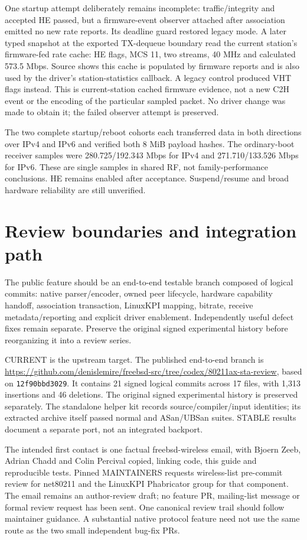 \documentclass[11pt,letterpaper,oneside]{article}
\newcommand{\code}[1]{\texttt{\small #1}}
\begin{document}
One startup attempt deliberately remains incomplete: traffic/integrity and accepted HE passed, but a firmware-event observer attached after association emitted no new rate reports. Its deadline guard restored legacy mode. A later typed snapshot at the exported TX-dequeue boundary read the current station's firmware-fed rate cache: HE flags, MCS 11, two streams, 40 MHz and calculated 573.5 Mbps. Source shows this cache is populated by firmware reports and is also used by the driver's station-statistics callback. A legacy control produced VHT flags instead. This is current-station cached firmware evidence, not a new C2H event or the encoding of the particular sampled packet. No driver change was made to obtain it; the failed observer attempt is preserved.

The two complete startup/reboot cohorts each transferred data in both directions over IPv4 and IPv6 and verified both 8 MiB payload hashes. The ordinary-boot receiver samples were 280.725/192.343 Mbps for IPv4 and 271.710/133.526 Mbps for IPv6. These are single samples in shared RF, not family-performance conclusions. HE remains enabled after acceptance. Suspend/resume and broad hardware reliability are still unverified.

\section{Review boundaries and integration path}
The public feature should be an end-to-end testable branch composed of logical commits: native parser/encoder, owned peer lifecycle, hardware capability handoff, association transaction, LinuxKPI mapping, bitrate, receive metadata/reporting and explicit driver enablement. Independently useful defect fixes remain separate. Preserve the original signed experimental history before reorganizing it into a review series.

CURRENT is the upstream target. The published end-to-end branch is \url{https://github.com/denislemire/freebsd-src/tree/codex/80211ax-sta-review}, based on \code{12f90bbd3029}. It contains 21 signed logical commits across 17 files, with 1,313 insertions and 46 deletions. The original signed experimental history is preserved separately. The standalone helper kit records source/compiler/input identities; its extracted archive itself passed normal and ASan/UBSan suites. STABLE results document a separate port, not an integrated backport.

The intended first contact is one factual freebsd-wireless email, with Bjoern Zeeb, Adrian Chadd and Colin Percival copied, linking code, this guide and reproducible tests. Pinned MAINTAINERS requests wireless-list pre-commit review for net80211 and the LinuxKPI Phabricator group for that component. The email remains an author-review draft; no feature PR, mailing-list message or formal review request has been sent. One canonical review trail should follow maintainer guidance. A substantial native protocol feature need not use the same route as the two small independent bug-fix PRs.
\end{document}
